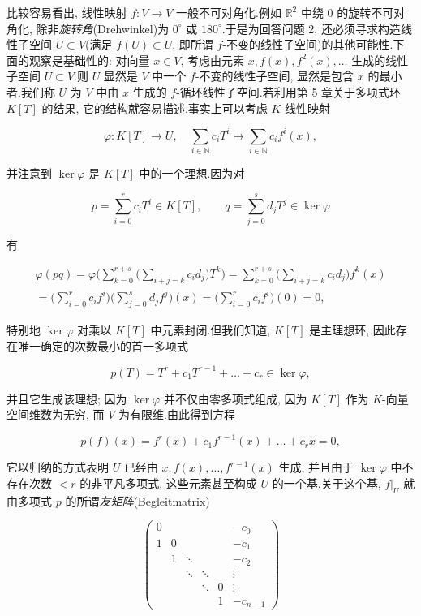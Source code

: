 比较容易看出, 线性映射 $f \colon V \longrightarrow V$ 一般不可对角化.例如 $\mathbb{R}^2$ 中绕 $0$ 的旋转不可对角化, 除非\emph{旋转角}(\textup{Drehwinkel})为 $0^{\circ}$ 或 $180^{\circ}$.于是为回答问题 2, 还必须寻求构造线性子空间 $U \subset V$(满足 $f(U) \subset U$, 即所谓 $f$-不变的线性子空间)的其他可能性.下面的观察是基础性的: 对向量 $x \in V$, 考虑由元素 $x, f(x), f^2(x), \ldots$ 生成的线性子空间 $U \subset V$.则 $U$ 显然是 $V$ 中一个 $f$-不变的线性子空间, 显然是包含 $x$ 的最小者.我们称 $U$ 为 $V$ 中由 $x$ 生成的 $f$-循环线性子空间.若利用第 5 章关于多项式环 $K[T]$ 的结果, 它的结构就容易描述.事实上可以考虑 $K$-线性映射

\[
\varphi \colon K[T] \longrightarrow U, \quad \sum_{i \in \mathbb{N}} c_i T^i \longmapsto \sum_{i \in \mathbb{N}} c_i f^i(x),\]

并注意到 $\ker \varphi$ 是 $K[T]$ 中的一个理想.因为对

\[
p = \sum_{i = 0}^{r} c_i T^i \in K[T], \qquad q = \sum_{j = 0}^{s} d_j T^j \in \ker \varphi\]

有

\[
\begin{array}{c}
\varphi(pq) = \varphi\bigg(\sum_{k = 0}^{r + s}\Big(\sum_{i + j = k} c_i d_j\Big) T^k\bigg)
= \sum_{k = 0}^{r + s}\Big(\sum_{i + j = k} c_i d_j\Big) f^k(x) \\
= \Big(\sum_{i = 0}^{r} c_i f^i\Big)\Big(\sum_{j = 0}^{s} d_j f^j\Big)(x) = \Big(\sum_{i = 0}^{r} c_i f^i\Big)(0) = 0,
\end{array}\]

特别地 $\ker \varphi$ 对乘以 $K[T]$ 中元素封闭.但我们知道, $K[T]$ 是主理想环, 因此存在唯一确定的次数最小的首一多项式

\[
p(T) = T^r + c_1 T^{r-1} + \ldots + c_r \in \ker \varphi,\]

并且它生成该理想; 因为 $\ker \varphi$ 并不仅由零多项式组成, 因为 $K[T]$ 作为 $K$-向量空间维数为无穷, 而 $V$ 为有限维.由此得到方程

\[
p(f)(x) = f^r(x) + c_1 f^{r-1}(x) + \ldots + c_r x = 0,\]

它以归纳的方式表明 $U$ 已经由 $x, f(x), \ldots, f^{r-1}(x)$ 生成, 并且由于 $\ker \varphi$ 中不存在次数 $< r$ 的非平凡多项式, 这些元素甚至构成 $U$ 的一个基.关于这个基, $f|_U$ 就由多项式 $p$ 的所谓\emph{友矩阵}(\textup{Begleitmatrix})

\[
\left(\begin{array}{cccccc}
0 & & & & & -c_0 \\
1 & 0 & & & & -c_1 \\
 & 1 & \ddots & & & -c_2 \\
 & & \ddots & \ddots & & \vdots \\
 & & & \ddots & 0 & \vdots \\
 & & & & 1 & -c_{n-1}
\end{array}\right)\]

